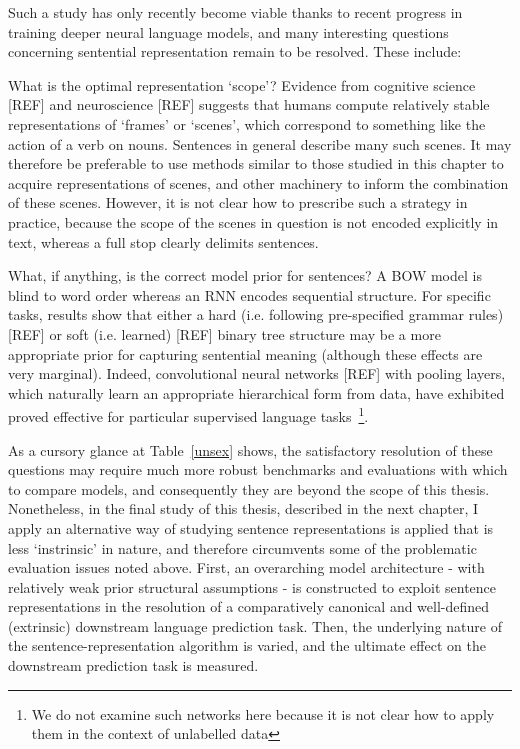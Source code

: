 Such a study has only recently become viable thanks to recent progress in training deeper neural language models, and many interesting questions concerning sentential representation remain to be resolved. These include: 

\begin{description}
\item{What is the optimal representation `scope'?} Evidence from cognitive science [REF] and neuroscience [REF] suggests that humans compute relatively stable representations of `frames' or `scenes', which correspond to something like the action of a verb on nouns. Sentences in general describe many such scenes. It may therefore be preferable to use methods similar to those studied in this chapter to acquire representations of scenes, and other machinery to inform the combination of these scenes. However, it is not clear how to prescribe such a strategy in practice, because the scope of the scenes in question is not encoded explicitly in text, whereas a full stop clearly delimits sentences.  

\item{What, if anything, is the correct model prior for sentences?} A BOW model is blind to word order whereas an RNN encodes sequential structure. For specific tasks, results show that either a hard (i.e. following pre-specified grammar rules) [REF] or soft (i.e. learned) [REF] binary tree structure may be a more appropriate prior for capturing sentential meaning (although these effects are very marginal). Indeed, convolutional neural networks [REF] with pooling layers, which naturally learn an appropriate hierarchical form from data, have exhibited proved effective for particular supervised language tasks~\footnote{We do not examine such networks here because it is not clear how to apply them in the context of unlabelled data}. 
\end{description}

As a cursory glance at Table~\ref{unsex} shows, the satisfactory resolution of these questions may require much more robust benchmarks and evaluations with which to compare models, and consequently they are beyond the scope of this thesis. Nonetheless, in the final study of this thesis, described in the next chapter, I apply an alternative way of studying sentence representations is applied that is less `instrinsic' in nature, and therefore circumvents some of the problematic evaluation issues noted above. First, an overarching model architecture - with relatively weak prior structural assumptions - is constructed to exploit sentence representations in the resolution of a comparatively canonical and well-defined (extrinsic) downstream language prediction task. Then, the underlying nature of the sentence-representation algorithm is varied, and the ultimate effect on the downstream prediction task is measured.    

